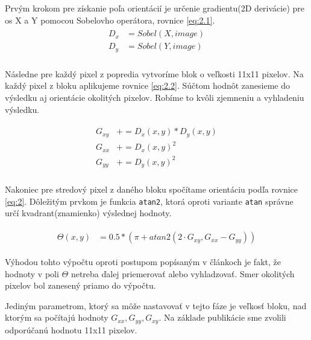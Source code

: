 \documentclass[11pt,a4paper]{article}
\begin{document}
Prvým krokom pre získanie poľa orientácií je určenie gradientu(2D derivácie) pre os X a Y pomocou Sobelovho operátora, rovnice \ref{eq:2.1}.
\begin{align}
\begin{split}
D_x &= Sobel(X, image)\\
D_y &= Sobel(Y, image)\\ 
\end{split}
\label{eq:2.1}
\end{align}

Následne pre každý pixel z popredia vytvoríme blok o veľkosti 11x11 pixelov. Na každý pixel z bloku aplikujeme rovnice \ref{eq:2.2}. Súčtom hodnôt zanesieme do výsledku aj orientácie okolitých pixelov. Robíme to kvôli zjemneniu a vyhladeniu výsledku.

\begin{align}
\begin{split}
G_{xy} &+= D_x(x,y) * D_y(x,y)\\
G_{xx} &+= D_x(x,y)^2\\
G_{yy} &+= D_y(x,y)^2\\
\end{split}
\label{eq:2.2}
\end{align}

Nakoniec pre stredový pixel z daného bloku spočítame orientáciu podľa rovnice \ref{eq:2}. Dôležitým prvkom je funkcia \texttt{atan2}, ktorá oproti variante \texttt{atan} správne určí kvadrant(znamienko) výslednej hodnoty.

\begin{align}
\begin{split}
\Theta(x,y) &= 0.5 * (\pi + atan2(2 \cdot G_{xy}, G_{xx} - G_{yy}))
\end{split}
\label{eq:2}
\end{align}




Výhodou tohto výpočtu oproti postupom popísaným v článkoch \cite{hong, thai} je fakt, že hodnoty v poli $\Theta$ netreba ďalej priemerovať alebo vyhladzovať. Smer okolitých pixelov bol zanesený priamo do výpočtu.

Jediným parametrom, ktorý sa môže nastavovať v tejto fáze je veľkosť bloku, nad ktorým sa počítajú hodnoty $G_{xx}, G_{yy}, G_{xy}$. Na základe publikácie \cite{kniha} sme zvolili odporúčanú hodnotu 11x11 pixelov.
\end{document}
